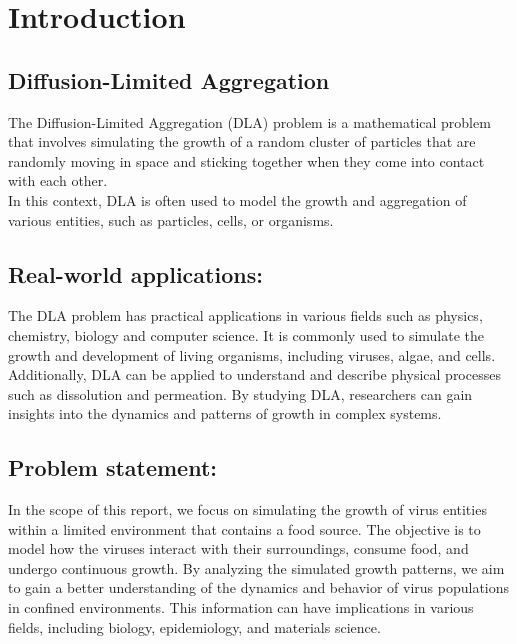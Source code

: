 \documentclass[a4paper,10pt,notitlepage]{article}
\begin{document}
\setlength{\parindent}{1cm}

\section{\textbf{Introduction}}
{\setlength{\parskip}{0.5cm}
\vspace{-0.5cm}
\hspace{1 cm}
\subsection{Diffusion-Limited Aggregation}
\hspace{1 cm}The Diffusion-Limited Aggregation (DLA) problem is a mathematical problem that involves simulating the growth of a random cluster of particles that are randomly moving in space and sticking together when they come into contact with each other. \\
In this context, DLA is often used to model the growth and aggregation of various entities, such as particles, cells, or organisms.
\subsection{Real-world applications:}
\hspace{1 cm}The DLA problem has practical applications in various fields such as physics, chemistry, biology and computer science. It is commonly used to simulate the growth and development of living organisms, including viruses, algae, and cells. Additionally, DLA can be applied to understand and describe physical processes such as dissolution and permeation. By studying DLA, researchers can gain insights into the dynamics and patterns of growth in complex systems.
\subsection{Problem statement:}
\hspace{1 cm}In the scope of this report, we focus on simulating the growth of virus entities within a limited environment that contains a food source. The objective is to model how the viruses interact with their surroundings, consume food, and undergo continuous growth. By analyzing the simulated growth patterns, we aim to gain a better understanding of the dynamics and behavior of virus populations in confined environments. This information can have implications in various fields, including biology, epidemiology, and materials science.
\newpage
}
\end{document}
